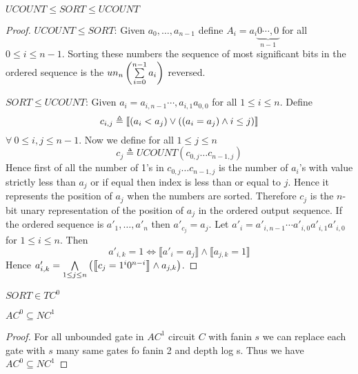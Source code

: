 \begin{theorem}
	$UCOUNT\leq SORT\leq UCOUNT$
\end{theorem}
\begin{proof} $UCOUNT\leq SORT$: 	Given $a_0,\dots, a_{n-1}$ define $A_i=a_i\underbrace{0\cdots,0}_{n-1}$ for all $0\leq i\leq n-1$. Sorting these numbers the sequence of most significant bits in the ordered sequence is the $un_n\left( \sum\limits_{i=0}^{n-1}a_i\right)$ reversed.

$SORT\leq UCOUNT$: Given $a_i=a_{i,n-1}\cdots, a_{i,1}a_{0,0}$ for all $1\leq i\leq n$.  Define $$c_{i,j}\triangleq\left\llbracket(a_i<a_j)\vee ((a_i=a_j)\wedge i\leq j)\right\rrbracket$$ $\forall\ 0\leq i,j\leq n-1$. Now we define for all $1\leq j\leq n$ $$c_j\triangleq UCOUNT(c_{0,j}\dots c_{n-1,j})$$Hence first of all the number of 1's in $c_{0,j}\dots c_{n-1,j}$ is the number of $a_i$'s with value strictly less than $a_j$ or if equal then index is less than or equal to $j$. Hence it represents the position of $a_j$ when the numbers are sorted. Therefore $c_j$ is the $n$-bit unary representation of the position of $a_j$ in the ordered output sequence. If the ordered sequence is $a'_{1}, \dots, a'_{n}$ then $a'_{c_j}=a_j$. Let $a'_i=a'_{i,n-1}\cdots a'_{i,0}a'_{i,1}a'_{i,0}$ for $1\leq i\leq n$. Then $$a'_{i,k}=1\iff \llbracket a'_{i}=a_j\rrbracket \wedge \llbracket a_{j,k}=1\rrbracket$$ Hence $a'_{i,k}=\bigwedge\limits_{1\leq j\leq n}\left(\left\llbracket c_j=1^i0^{n-i}\right\rrbracket \wedge a_{j,k}  \right)$.
\end{proof}

\begin{corollary}
	$SORT\in TC^0$
\end{corollary}
\begin{theorem}
	$AC^0\subseteq NC^1$
\end{theorem}
\begin{proof}
	For all unbounded gate in $AC^1$ circuit $C$ with fanin $s$ we can replace each gate with $s$ many same gates fo fanin 2 and depth log s. Thus we have $AC^0\subseteq NC^1$
\end{proof}

